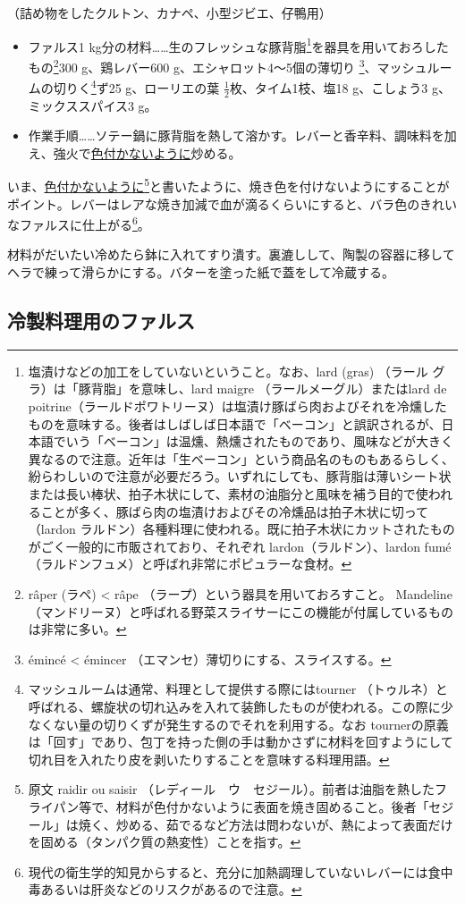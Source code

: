 \begin{recette}
（詰め物をしたクルトン、カナペ、小型ジビエ、仔鴨用）

\begin{itemize}
\item
  ファルス1 kg分の材料\ldots{}\ldots{}生のフレッシュな豚背脂\footnote{塩漬けなどの加工をしていないということ。なお、lard
    (gras) （ラール グラ）は「豚背脂」を意味し、lard maigre
    （ラールメーグル）またはlard de
    poitrine（ラールドポワトリーヌ）は塩漬け豚ばら肉およびそれを冷燻したものを意味する。後者はしばしば日本語で「ベーコン」と誤訳されるが、日本語でいう「ベーコン」は温燻、熱燻されたものであり、風味などが大きく異なるので注意。近年は「生ベーコン」という商品名のものもあるらしく、紛らわしいので注意が必要だろう。いずれにしても、豚背脂は薄いシート状または長い棒状、拍子木状にして、素材の油脂分と風味を補う目的で使われることが多く、豚ばら肉の塩漬けおよびその冷燻品は拍子木状に切って（lardon
    ラルドン）各種料理に使われる。既に拍子木状にカットされたものがごく一般的に市販されており、それぞれ
    lardon（ラルドン）、lardon
    fumé（ラルドンフュメ）と呼ばれ非常にポピュラーな食材。}を器具を用いておろしたもの\footnote{râper
    (ラペ) \textless{} râpe （ラープ）という器具を用いておろすこと。
    Mandeline
    （マンドリーヌ）と呼ばれる野菜スライサーにこの機能が付属しているものは非常に多い。}300
  g、鶏レバー600 g、エシャロット4〜5個の薄切り \footnote{émincé
    \textless{} émincer （エマンセ）薄切りにする、スライスする。}、マッシュルームの切りく\footnote{マッシュルームは通常、料理として提供する際にはtourner
    （トゥルネ）と呼ばれる、螺旋状の切れ込みを入れて装飾したものが使われる。この際に少なくない量の切りくずが発生するのでそれを利用する。なお
    tournerの原義は「回す」であり、包丁を持った側の手は動かさずに材料を回すようにして切れ目を入れたり皮を剥いたりすることを意味する料理用語。}ず25
  g、ローリエの葉 \(\frac{1}{2}\)枚、タイム1枝、塩18 g、こしょう3
  g、ミックススパイス3 g。
\item
  作業手順\ldots{}\ldots{}ソテー鍋に豚背脂を熱して溶かす。レバーと香辛料、調味料を加え、強火で\ul{色付かないように}炒める。
\end{itemize}

いま、\ul{色付かないように}\footnote{原文 raidir ou saisir
  （レディール　ウ　セジール）。前者は油脂を熱したフライパン等で、材料が色付かないように表面を焼き固めること。後者「セジール」は焼く、炒める、茹でるなど方法は問わないが、熱によって表面だけを固める（タンパク質の熱変性）ことを指す。}と書いたように、焼き色を付けないようにすることがポイント。レバーはレアな焼き加減で血が滴るくらいにすると、バラ色のきれいなファルスに仕上がる\footnote{現代の衛生学的知見からすると、充分に加熱調理していないレバーには食中毒あるいは肝炎などのリスクがあるので注意。}。

材料がだいたい冷めたら鉢に入れてすり潰す。裏漉しして、陶製の容器に移してヘラで練って滑らかにする。バターを塗った紙で蓋をして冷蔵する。
\end{recette}
\hypertarget{farce-pour-les-pieces-froides}{%
\subsection{冷製料理用のファルス}\label{farce-pour-les-pieces-froides}}

